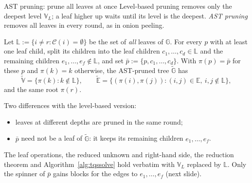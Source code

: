 \documentclass[aspectratio=169,11pt]{beamer}
\begin{document}
\begin{frame}{AST pruning: prune all leaves at once}
\footnotesize
Level-based pruning removes only the deepest level $\mathbb{V}_L$; a leaf higher up waits until its level is the deepest.
\emph{AST pruning} removes all leaves in every round, as in onion peeling.

\begin{definition}
\upshape
Let $\mathbb{L}:=\{i\neq r:\mathcal{C}(i)=\emptyset\}$ be the set of \emph{all} leaves of $\mathbb{G}$. For every $p$ with
at least one leaf child, split its children into the leaf children $c_1,\dots,c_d\in\mathbb{L}$ and the remaining children
$e_1,\dots,e_f\notin\mathbb{L}$, and set $\bar{p}:=\{p,c_1,\dots,c_d\}$. With $\pi(p)=\bar{p}$ for these $p$ and
$\pi(k)=k$ otherwise, the AST-pruned tree $\tilde{\mathbb{G}}$ has
\[
\tilde{\mathbb{V}}=\{\pi(k):k\notin\mathbb{L}\},\qquad
\tilde{\mathbb{E}}=\{(\pi(i),\pi(j)) : (i,j)\in\mathbb{E},\ i,j\notin\mathbb{L}\},
\]
and the same root $\pi(r)$.
\end{definition}

\vspace{1mm}
Two differences with the level-based version:
\begin{itemize}
\item leaves at different depths are pruned in the same round;
\item $\bar{p}$ need not be a leaf of $\tilde{\mathbb{G}}$: it keeps its remaining children $e_1,\dots,e_f$.
\end{itemize}
The leaf operations, the reduced unknown and right-hand side, the reduction theorem and
Algorithm~\ref{alg:tqssolve} hold verbatim with $\mathbb{V}_L$ replaced by $\mathbb{L}$. Only the spinner of $\bar{p}$
gains blocks for the edges to $e_1,\dots,e_f$ (next slide).
\end{frame}
\end{document}
